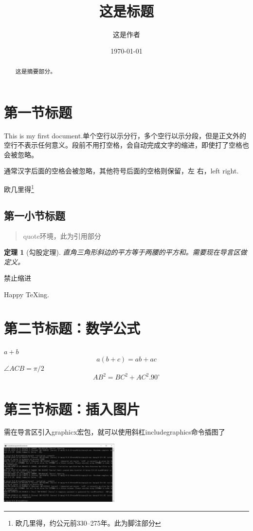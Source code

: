 \documentclass[UTF8]{ctexart}%
\title{\heiti 这是标题}
\author{\kaishu 这是作者}
\date{\today}
\newtheorem{thm}{定理}%
\begin{document}
\maketitle
\tableofcontents%
\listoffigures%
\listoftables%
\begin{abstract}
这是摘要部分。
\end{abstract}

\section{第一节标题}
This is my first document.单个空行以示分行，多个空行以示分段，但是正文外的空行不表示任何意义。段前不用打空格，会自动完成文字的缩进，即使打了空格也会被忽略。

通常汉字后面的空格会被忽略，其他符号后面的空格则保留，左 右，left right.

欧几里得\footnote{欧几里得，约公元前330--275年。此为脚注部分}
\subsection{第一小节标题}
\begin{quote}
	\kaishu%
	quote环境，此为引用部分
\end{quote}

\begin{thm}[勾股定理]
	直角三角形斜边的平方等于两腰的平方和。需要现在导言区做定义。
\end{thm}
\noindent 禁止缩进

Happy \TeX ing.
\section{第二节标题：数学公式}
$a+b$%
\begin{equation}
	a(b+c)=ab+ac
\end{equation}
$\angle ACB=\pi/2$
\begin{equation}
	AB^2=BC^2+AC^2.
	90^\circ
\end{equation}
\section{第三节标题：插入图片}

需在导言区引入graphicx宏包，就可以使用斜杠includegraphics命令插图了

\includegraphics[width=6cm]{picture1.png}
\end{document}
